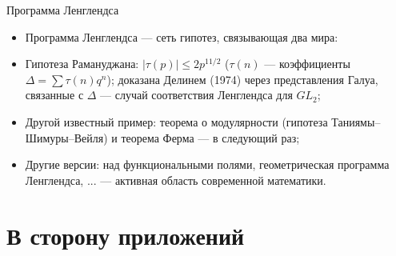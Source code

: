 \documentclass[serif, aspectratio=169]{beamer}
\begin{document}
\begin{frame}{Программа Ленглендса}
    \begin{itemize}
        \item Программа Ленглендса --- сеть гипотез, связывающая два мира:
        \begin{center}
        \end{center}
        \item Гипотеза Рамануджана: $|\tau(p)|\le2p^{11/2}$ ($\tau(n)$ --- коэффициенты $\Delta=\sum\tau(n)q^n$); доказана Делинем (1974) через представления Галуа, связанные с $\Delta$ --- случай соответствия Ленглендса для $GL_2$;
        \item Другой известный пример: теорема о модулярности (гипотеза Таниямы--Шимуры--Вейля) и теорема Ферма --- в следующий раз;
        \item Другие версии: над функциональными полями, геометрическая программа Ленглендса, ... --- активная область современной математики.
    \end{itemize}
    \note{
        \begin{itemize}
            \item ---
        \end{itemize}
    }
\end{frame}

\section{В сторону приложений}
\end{document}
